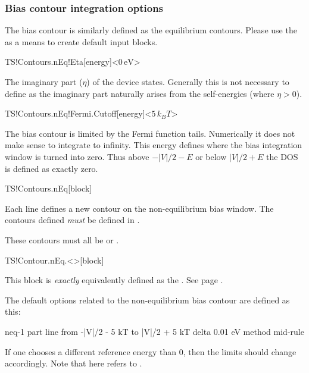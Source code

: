 \subsubsection{Bias contour integration options}

The bias contour is similarly defined as the equilibrium
contours. Please use the  as a means to
create default input blocks.

\begin{fdfentry}{TS!Contours.nEq!Eta}[energy]<$0\,\mathrm{eV}$>

  The imaginary part ($\eta$) of the device states. Generally this is
  not necessary to define as the imaginary part naturally arises from
  the self-energies (where $\eta>0$).
  
\end{fdfentry}

\begin{fdfentry}{TS!Contours.nEq!Fermi.Cutoff}[energy]<$5\,k_BT$>

  The bias contour is limited by the Fermi function tails. Numerically
  it does not make sense to integrate to infinity.
  This energy defines where the bias integration window is turned into
  zero. Thus above $-|V|/2-E$ or below $|V|/2+E$ the DOS is defined as
  exactly zero.

\end{fdfentry}

\begin{fdfentry}{TS!Contours.nEq}[block]

  Each line defines a new contour on the non-equilibrium bias
  window. The contours defined \emph{must} be defined in
  . 

  These contours must all be  or . 
  
\end{fdfentry}

\begin{fdfentry}{TS!Contour.nEq.<>}[block]

  This block is \emph{exactly} equivalently defined as the
  . See page \pageref{TS!Contour.<>}.
  
\end{fdfentry}

The default options related to the non-equilibrium bias contour are
defined as this:
\begin{fdfexample}
    neq-1
    part line
     from -|V|/2 - 5 kT to |V|/2 + 5 kT
       delta 0.01 eV
        method mid-rule
\end{fdfexample}
If one chooses a different reference energy than $0$, then the limits
should change accordingly. Note that here  refers to
.



